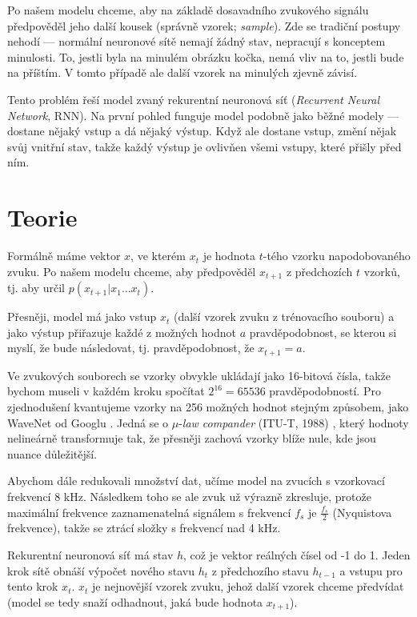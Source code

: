 \documentclass[a4]{article}
\begin{document}
Po našem modelu chceme, aby na základě dosavadního zvukového signálu předpověděl jeho další kousek (správně vzorek; \textit{sample}). Zde se tradiční postupy nehodí --- normální neuronové sítě nemají žádný stav, nepracují s konceptem minulosti. To, jestli byla na minulém obrázku kočka, nemá vliv na to, jestli bude na příštím. V tomto případě ale další vzorek na minulých zjevně závisí.

Tento problém řeší model zvaný rekurentní neuronová síť (\textit{Recurrent Neural Network}, RNN). Na první pohled funguje model podobně jako běžné modely --- dostane nějaký vstup a dá nějaký výstup. Když ale dostane vstup, změní nějak svůj vnitřní stav, takže každý výstup je ovlivňen všemi vstupy, které přišly před ním.

\section{Teorie} \label{teorie}

Formálně máme vektor $x$, ve kterém $x_t$ je hodnota $t$-tého vzorku napodobovaného zvuku. Po našem modelu chceme, aby předpověděl $x_{t+1}$ z předchozích $t$ vzorků, tj. aby určil $p(x_{t+1} | x_{1} \dots x_{t})$.

Přesněji, model má jako vstup $x_t$ (další vzorek zvuku z trénovacího souboru) a jako výstup přiřazuje každé z možných hodnot $a$ pravděpodobnost, se kterou si myslí, že bude následovat, tj. pravděpodobnost, že $x_{t+1}=a$.

Ve zvukových souborech se vzorky obvykle ukládají jako 16-bitová čísla, takže bychom museli v každém kroku spočítat $2^{16} = 65 536$ pravděpodobností. Pro zjednodušení kvantujeme vzorky na 256 možných hodnot stejným způsobem, jako WaveNet od Googlu \cite{wavenet}. Jedná se o $\mu$-\textit{law compander} (ITU-T, 1988) \cite{mulaw}, který hodnoty nelineárně transformuje tak, že přesněji zachová vzorky blíže nule, kde jsou nuance důležitější.

Abychom dále redukovali množství dat, učíme model na zvucích s vzorkovací frekvencí 8 kHz. Následkem toho se ale zvuk už výrazně zkresluje, protože maximální frekvence zaznamenatelná signálem s frekvencí $f_s$ je $\frac{f_s}{2}$ (Nyquistova frekvence), takže se ztrácí složky s frekvencí nad 4 kHz.

Rekurentní neuronová síť má stav $h$, což je vektor reálných čísel od -1 do 1. Jeden krok sítě obnáší výpočet nového stavu $h_t$ z předchozího stavu $h_{t-1}$ a vstupu pro tento krok $x_t$. $x_t$ je nejnovější vzorek zvuku, jehož další vzorek chceme předvídat (model se tedy snaží odhadnout, jaká bude hodnota $x_{t+1}$).
\end{document}
